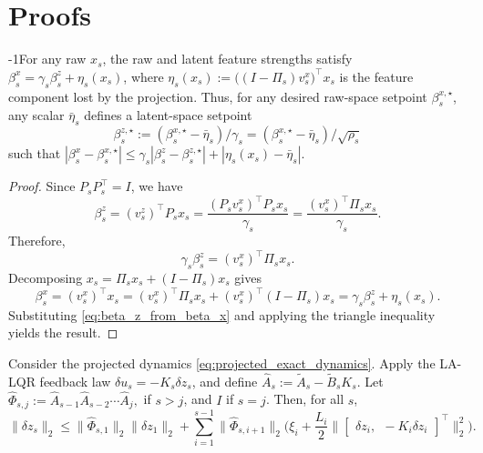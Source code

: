\documentclass{article}
\begin{document}
\clearpage



\appendix

\section{Proofs}\label{app:proofs}

\begin{lemma}
\label{lem:projection_calibrated_lfs_app}
\looseness-1For any raw $x_s$, the raw and latent feature strengths
satisfy $\beta^x_s = \gamma_s \beta^z_s + \eta_s(x_s)$, 
where $\eta_s(x_s) := \bigl((I-\Pi_s)v^x_s\bigr)^\top x_s$
is the feature component lost by the projection. Thus, for
any desired raw-space setpoint $\beta^{x,\star}_s$, any scalar
$\bar\eta_s$ defines a latent-space setpoint
\begin{equation}
    \beta^{z,\star}_s
    :=
    (\beta^{x,\star}_s-\bar\eta_s)/\gamma_s = (\beta^{x,\star}_s-\bar\eta_s)/\sqrt{\rho_s}
    \label{eq:beta_z_from_beta_x}
\end{equation}
such that $\left|
    \beta^x_s-\beta^{x,\star}_s
    \right|
    \le
    \gamma_s
    \left|
    \beta^z_s-\beta^{z,\star}_s
    \right|
    +
    \left|
    \eta_s(x_s)-\bar\eta_s
    \right|$.
\end{lemma}

\begin{proof}
Since $P_sP_s^\top=I$, we have
\[
    \beta^z_s
    =
    (v^z_s)^\top P_sx_s
    =
    \frac{(P_sv^x_s)^\top P_sx_s}{\gamma_s}
    =
    \frac{(v^x_s)^\top \Pi_s x_s}{\gamma_s}.
\]
Therefore,
\[
    \gamma_s\beta^z_s
    =
    (v^x_s)^\top \Pi_s x_s.
\]
Decomposing $x_s=\Pi_sx_s+(I-\Pi_s)x_s$ gives
\[
    \beta^x_s
    =
    (v^x_s)^\top x_s
    =
    (v^x_s)^\top \Pi_sx_s
    +
    (v^x_s)^\top (I-\Pi_s)x_s
    =
    \gamma_s\beta^z_s+\eta_s(x_s).
\]
Substituting \eqref{eq:beta_z_from_beta_x} and applying the triangle
inequality yields the result.
\end{proof}


\begin{theorem}
\label{thm:app_latent_tracking_projection_loss}
Consider the projected dynamics \eqref{eq:projected_exact_dynamics}.
Apply the LA-LQR feedback law
$\delta u_s=-K_s\delta z_s$,
and define
$\widehat A_s:=\tilde A_s-\tilde B_sK_s$.
Let $\widehat\Phi_{s,j} := \widehat A_{s-1}\widehat A_{s-2}\cdots \widehat A_j,$ if $s>j$, and $I$ if $s = j$. 
Then, for all $s$,
\begin{equation}
    \textstyle\|\delta z_s\|_2
    \le
    \|\widehat\Phi_{s,1}\|_2\|\delta z_1\|_2
    +
    \sum_{i=1}^{s-1}
    \|\widehat\Phi_{s,i+1}\|_2
    \big(
    \xi_i
    +
    \frac{L_i}{2}
    \big\|
    \begin{bmatrix}
    \delta z_i,\ \
    -K_i\delta z_i
    \end{bmatrix}^\top
    \big\|_2^2
    \big).
    \label{eq:latent_tracking_projection_bound_2}
\end{equation}
\end{theorem}
\end{document}
